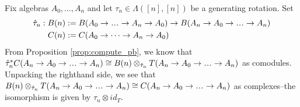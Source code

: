 \begin{eg}
\label{eg:pb5}
Fix algebras $A_0, \dots, A_n$ and let 
$\tau_n \in \Lambda([n],[n])$ 
be a generating rotation. Set
\begin{align*}
\hat{\tau}_n: B(n) 
&:= B(A_0 \to \smdots \to A_n \to A_0) \to 
B(A_n \to A_0 \to \smdots \to A_n)\\
C(n) &:= 
C(A_0 \to \dots \to A_n \to A_0)
\end{align*}
From Proposition \ref{prop:compute_pb}, we 
know that $\hat{\tau}_n^*
C(A_n \to A_0 \to \smdots \to A_n) 
\cong B(n) \otimes_{\hat{\tau}_n} 
T(A_n \to A_0 \to \smdots \to A_n)$ 
as comodules. Unpacking the 
righthand side, we see that $B(n) 
\otimes_{\hat{\tau}_n} 
T(A_n \to A_0 \to \smdots \to A_n) 
\cong C(A_n \to A_0 \to \smdots \to A_n)$ 
as complexes--the 
isomorphism is given by $\hat{\tau}_n 
\otimes id_{T}$.
\end{eg}